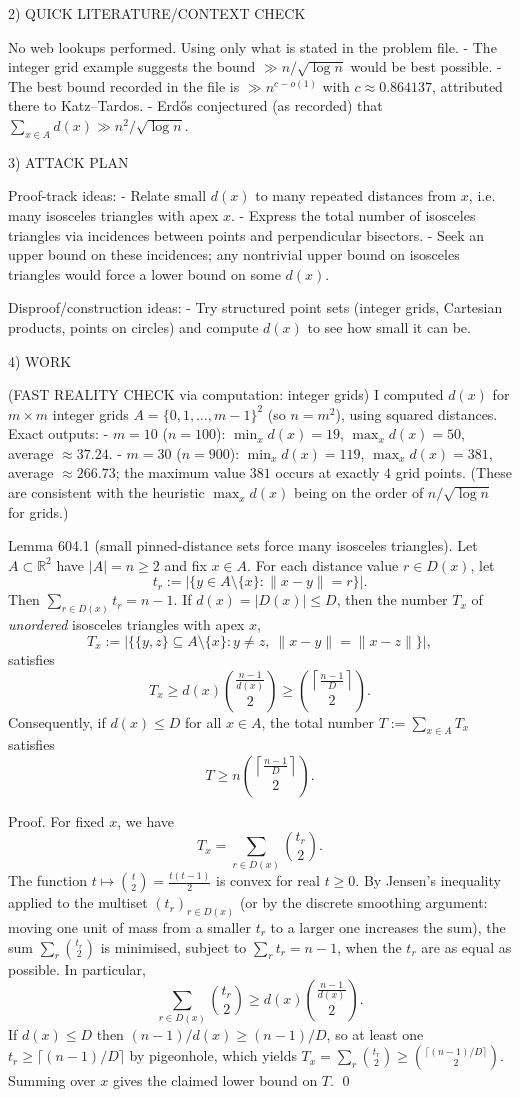 2) QUICK LITERATURE/CONTEXT CHECK

No web lookups performed. Using only what is stated in the problem file.
- The integer grid example suggests the bound $\gg n/\sqrt{\log n}$ would be best possible.
- The best bound recorded in the file is $\gg n^{c-o(1)}$ with $c\approx 0.864137$, attributed there to Katz--Tardos.
- Erd\H{o}s conjectured (as recorded) that $\sum_{x\in A} d(x)\gg n^2/\sqrt{\log n}$.

3) ATTACK PLAN

Proof-track ideas:
- Relate small $d(x)$ to many repeated distances from $x$, i.e. many isosceles triangles with apex $x$.
- Express the total number of isosceles triangles via incidences between points and perpendicular bisectors.
- Seek an upper bound on these incidences; any nontrivial upper bound on isosceles triangles would force a lower bound on some $d(x)$.

Disproof/construction ideas:
- Try structured point sets (integer grids, Cartesian products, points on circles) and compute $d(x)$ to see how small it can be.

4) WORK

(FAST REALITY CHECK via computation: integer grids)
I computed $d(x)$ for $m\times m$ integer grids $A=\{0,1,\dots,m-1\}^2$ (so $n=m^2$), using squared distances.
Exact outputs:
- $m=10$ ($n=100$): $\min_x d(x)=19$, $\max_x d(x)=50$, average $\approx 37.24$.
- $m=30$ ($n=900$): $\min_x d(x)=119$, $\max_x d(x)=381$, average $\approx 266.73$; the maximum value $381$ occurs at exactly $4$ grid points.
(These are consistent with the heuristic $\max_x d(x)$ being on the order of $n/\sqrt{\log n}$ for grids.)

Lemma 604.1 (small pinned-distance sets force many isosceles triangles).
Let $A\subset\mathbb R^2$ have $|A|=n\ge 2$ and fix $x\in A$.
For each distance value $r\in D(x)$, let
\[
t_r := |\{y\in A\setminus\{x\}: \|x-y\|=r\}|.
\]
Then $\sum_{r\in D(x)} t_r = n-1$.
If $d(x)=|D(x)|\le D$, then the number $T_x$ of \emph{unordered} isosceles triangles with apex $x$,
\[
T_x := |\{\{y,z\}\subseteq A\setminus\{x\}: y\neq z,\ \|x-y\|=\|x-z\|\}|,
\]
satisfies
\[
T_x \ge d(x)\binom{\frac{n-1}{d(x)}}{2} \ge \binom{\left\lceil\frac{n-1}{D}\right\rceil}{2}.
\]
Consequently, if $d(x)\le D$ for all $x\in A$, the total number $T:=\sum_{x\in A} T_x$ satisfies
\[
T \ge n\binom{\left\lceil\frac{n-1}{D}\right\rceil}{2}.
\]

Proof.
For fixed $x$, we have
\[
T_x = \sum_{r\in D(x)} \binom{t_r}{2}.
\]
The function $t\mapsto \binom{t}{2}=\frac{t(t-1)}{2}$ is convex for real $t\ge 0$.
By Jensen's inequality applied to the multiset $(t_r)_{r\in D(x)}$ (or by the discrete smoothing argument: moving one unit of mass from a smaller $t_r$ to a larger one increases the sum), the sum $\sum_r \binom{t_r}{2}$ is minimised, subject to $\sum_r t_r=n-1$, when the $t_r$ are as equal as possible.
In particular,
\[
\sum_{r\in D(x)} \binom{t_r}{2} \ge d(x)\binom{\frac{n-1}{d(x)}}{2}.
\]
If $d(x)\le D$ then $(n-1)/d(x)\ge (n-1)/D$, so at least one $t_r\ge \lceil (n-1)/D\rceil$ by pigeonhole, which yields
$T_x=\sum_r\binom{t_r}{2}\ge \binom{\lceil (n-1)/D\rceil}{2}$.
Summing over $x$ gives the claimed lower bound on $T$.
\qed

